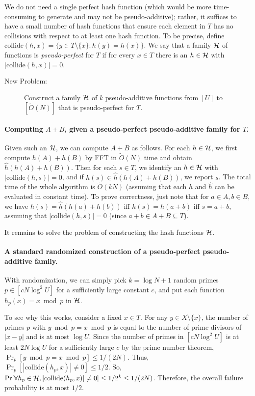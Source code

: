 \documentclass[11pt]{article}
\newcommand{\OO}{\widetilde{O}}
\begin{document}
{\newcommand{\collide}{\textrm{collide}}
\newcommand{\HH}{{\cal H}}

We do not need a single perfect hash function (which would be
more time-consuming to generate and may not be pseudo-additive); rather,
it suffices to have a small number
of hash functions that ensure each element in $T$ has no collisions
with respect to at least one hash function.  To be precise,
define $\collide(h,x)=\{y\in T\setminus\{x\}: h(y)=h(x)\}$.
We say that
a family $\HH$ of functions is \emph{pseudo-perfect} for $T$
if for every $x\in T$ there is an $h\in \HH$ with $|\collide(h,x)|=0$.
\begin{description}
\item[New Problem:] Construct a family $\HH$ of $k$ pseudo-additive functions from $[U]$ to $[\OO(N)]$ that is pseudo-perfect for $T$.
\end{description}

\paragraph{Computing $A+B$, given a pseudo-perfect pseudo-additive family for $T$.}

\newcommand{\hh}{\hat{h}}
Given such an $\HH$, we can compute $A+B$ as follows.
For each $h\in\HH$, we first compute $h(A)+h(B)$ by FFT in
$\OO(N)$ time and obtain $\hh(h(A)+h(B))$.
Then for each $s\in T$, we identify an
$h\in\HH$ with $|\collide(h,s)|=0$, and if $h(s)\in \hh(h(A)+h(B))$, we report $s$.
The total time of the whole algorithm is $\OO(kN)$
(assuming that each $h$ and $\hh$ can be evaluated in constant time).
To prove correctness, just note that
for $a\in A,b\in B$, we have
$h(s)=\hh(h(a)+h(b))$ iff $h(s)=h(a+b)$ iff $s=a+b$,
assuming that $|\collide(h,s)|=0$ (since $a+b\in A+B\subseteq T$).


It remains to solve the problem of constructing the hash functions $\HH$.

\paragraph{A standard randomized construction of
a pseudo-perfect pseudo-additive family.}
With randomization, we can simply pick $k=\log N + 1$ random primes $p\in [cN\log^2 U]$ for a sufficiently large constant $c$,
and put each function $h_p(x)=x\bmod{p}$ in $\HH$.

To see why this works, consider a fixed $x\in T$.
For any $y\in X\setminus\{x\}$, the number of primes $p$ with $y\bmod{p}=x\bmod{p}$ is equal to the number of prime divisors of
$|x-y|$
and is at most $\log U$.  Since the number of primes in $[cN\log^2 U]$
is at least $2N\log U$ for a sufficiently large $c$ by the
prime number theorem, $\Pr_p[y\bmod{p}=x\bmod{p}]\le 1/(2N)$.
Thus, $\Pr_p[ |\collide(h_p,x)|\neq 0] \le 1/2$.
So, $\Pr[\forall h_p\in\HH, |\collide(h_p,x)|\neq 0]\le 1/2^k \le 1/(2N)$.  Therefore, the overall failure probability is at most $1/2$.

}
\end{document}
